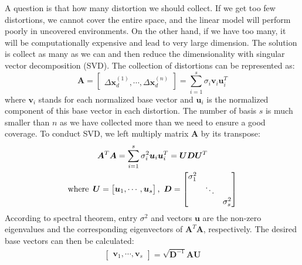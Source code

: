 \documentclass[journal]{IEEEtran}
\begin{document}
A question is that how many distortion we should collect.
If we get too few distortions, we cannot cover the entire space, and the linear model will perform poorly in uncovered environments.
On the other hand, if we have too many, it will be computationally expensive and lead to very large dimension. 
The solution is collect as many as we can and then reduce the dimensionality with singular vector decomposition (SVD). The collection of distortions can be represented as:
\begin{equation}
\bm{A} = 
\begin{bmatrix}
\Delta \bm{x}_d^{(1)}, \cdots, \Delta \bm{x}_d^{(n)}
\end{bmatrix}
= \sum_{i=1}^s \sigma_i \bm{v}_i \bm{u}_i^T
\label{SVD}
\end{equation}
where $\bm{v}_i$ stands for each normalized base vector and $\bm{u}_i$ is the normalized component of this base vector in each distortion.
The number of basis $s$ is much smaller than $n$ as we have collected more than we need to ensure a good coverage.
To conduct SVD, we left multiply matrix $\bm{A}$ by its transpose:
\begin{equation}
\begin{gathered}
\bm{A}^T \bm{A} = 
\sum_{i=1}^s \sigma_i^2 \bm{u}_i \bm{u}_i^T = \bm{U} \bm{D} \bm{U}^T
\\
\text{where \,}
\bm{U} = 
\begin{bmatrix}
\bm{u}_1, \cdots, \bm{u}_s
\end{bmatrix}
\text{, \,}
\bm{D} = 
\begin{bmatrix}
\sigma_1^2 &  &  \\
 & \ddots &  \\
 &  & \sigma_s^2 \\
\end{bmatrix}
\end{gathered}
\label{ATA}
\end{equation}
According to spectral theorem, entry $\sigma^2$ and vectors $\bm{u}$  are the non-zero eigenvalues and the corresponding eigenvectors of $\bm{A}^T\bm{A}$, respectively. 
The desired base vectors can then be calculated:
\begin{equation}
\begin{gathered}
\begin{bmatrix}
\bm{v}_1, \cdots, \bm{v}_s
\end{bmatrix} = 
\sqrt{\bm{D}^{-1}} \bm{A} \bm{U}
\end{gathered}
\label{basis}
\end{equation}
\end{document}
